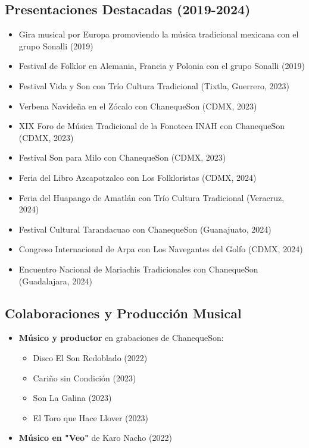 \documentclass{article}
\begin{document}
\subsection*{Presentaciones Destacadas (2019-2024)}
\begin{itemize}
    \item Gira musical por Europa promoviendo la música tradicional mexicana con el grupo Sonalli (2019)
    \item Festival de Folklor en Alemania, Francia y Polonia con el grupo Sonalli (2019)
    \item Festival Vida y Son con Trío Cultura Tradicional (Tixtla, Guerrero, 2023)
    \item Verbena Navideña en el Zócalo con ChanequeSon (CDMX, 2023)
    \item XIX Foro de Música Tradicional de la Fonoteca INAH con ChanequeSon (CDMX, 2023)
    \item Festival Son para Milo con ChanequeSon (CDMX, 2023)
    \item Feria del Libro Azcapotzalco con Los Folkloristas (CDMX, 2024)
    \item Feria del Huapango de Amatlán con Trío Cultura Tradicional (Veracruz, 2024)
    \item Festival Cultural Tarandacuao con ChanequeSon (Guanajuato, 2024)
    \item Congreso Internacional de Arpa con Los Navegantes del Golfo (CDMX, 2024)
    \item Encuentro Nacional de Mariachis Tradicionales con ChanequeSon (Guadalajara, 2024)
\end{itemize}

\subsection*{Colaboraciones y Producción Musical}
\begin{itemize}
    \item \textbf{Músico y productor} en grabaciones de ChanequeSon:
    \begin{itemize}
        \item Disco El Son Redoblado (2022)
        \item Cariño sin Condición (2023)
        \item Son La Galina (2023)
        \item El Toro que Hace Llover (2023)
    \end{itemize}
    \item \textbf{Músico en "Veo"} de Karo Nacho (2022)
\end{itemize}
\end{document}
